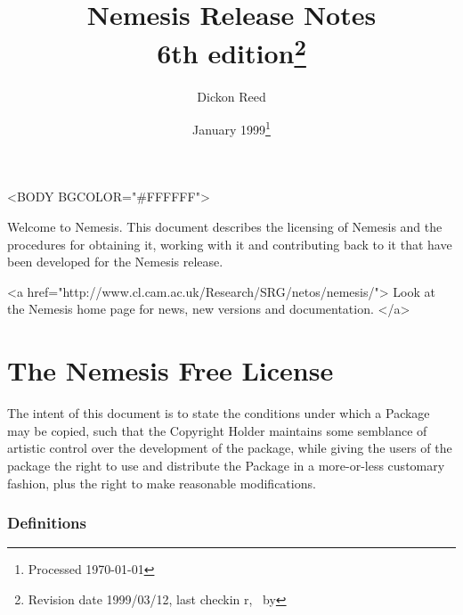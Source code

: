 \documentclass[a4paper]{article}
\title{Nemesis Release Notes\\
  6th edition\thanks{Revision date 1999/03/12, last checkin
    r\checkinversion, \checkindate\ by \checkinauthor}}
\date{January 1999\thanks{Processed \today}}
\author{Dickon Reed}
\begin{document}
\maketitle
\tableofcontents

\begin{rawhtml}
<BODY BGCOLOR="#FFFFFF">
\end{rawhtml}
Welcome to Nemesis. This document describes the licensing of Nemesis
and the procedures for obtaining it, working with it and contributing
back to it that have been developed for the Nemesis release.

\begin{htmlonly}
\begin{rawhtml}
<a href="http://www.cl.cam.ac.uk/Research/SRG/netos/nemesis/"> Look
at the Nemesis home page for news, new versions and
documentation. </a>
\end{rawhtml}
\end{htmlonly}

\section{The Nemesis Free License}

The intent of this document is to state the conditions under which a
Package may be copied, such that the Copyright Holder maintains some
semblance of artistic control over the development of the package,
while giving the users of the package the right to use and distribute
the Package in a more-or-less customary fashion, plus the right to make
reasonable modifications.

\subsubsection{Definitions}
\end{document}
